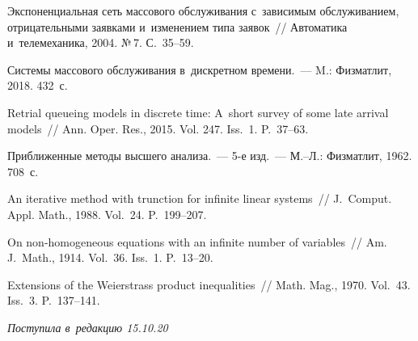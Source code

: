 \begin{multicols}{2}
{{\begin{thebibliography}{99}
Экспоненциальная сеть массового обслуживания с~зависимым обслуживанием, 
отрицательными заявками и~изменением типа заявок~// Автоматика и~телемеханика, 
2004. №\,7. С.~35--59.


Системы массового обслуживания в~дискретном времени.~--- M.: Физматлит, 
2018. 432~с.


Retrial queueing models in discrete time: A~short survey of some late 
arrival models~//
Ann. Oper. Res., 2015. Vol. 247. Iss.~1. P.~37--63.

 Приближенные методы высшего 
анализа.~--- 5-е изд.~--- М.--Л.: Физматлит, 1962. 708~с.

An iterative method with trunction for infinite linear systems~// J.~Comput. Appl. Math., 1988.
Vol.~24. P.~199--207.

 On non-homogeneous equations with an infinite 
number of variables~// Am. J.~Math., 1914. Vol.~36. Iss.~1. P.~13--20.

Extensions of the Weierstrass product inequalities~//
Math. Mag., 1970. Vol.~43. Iss.~3. P.~137--141.
\end{thebibliography}

 }
 }

\end{multicols}

\vspace*{-6pt}

\hfill{\small\textit{Поступила в~редакцию 15.10.20}}

\vspace*{8pt}




